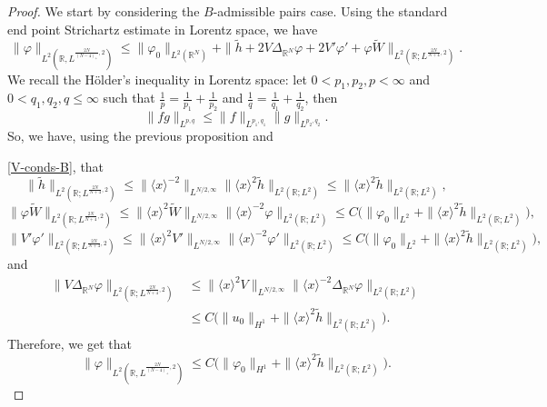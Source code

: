 \documentclass[10pt,a4paper]{amsart}
\newcommand{\R}{\mathbb{R}}
\begin{document}
\begin{proof}
We start by considering the $B$-admissible pairs case.
Using the standard end point Strichartz estimate in Lorentz space, we have
\begin{equation}
\label{stripausa}
\|\varphi\|_{L^2 (\R, L^{\frac{2N}{(N-4)_+},2 })} \leq \|\varphi_0\|_{L^2 (\R^N)} + \| \tilde{h} + 2V\Delta_{\R^N} \varphi +2V' \varphi' +\varphi\tilde{W}\|_{L^2 (\R; L^{\frac{2N}{N+4} ,2})}. 
\end{equation}
We recall the H\"older's inequality in Lorentz space: let $0<p_1,p_2,p<\infty$ and  $0<q_1,q_2, q \leq \infty$ such that  $\frac{1}{p}= \frac{1}{p_1}+\frac{1}{p_2}$ and  $\frac{1}{q}=\frac{1}{q_1}+\frac{1}{q_2}$, then
$$\|fg\|_{L^{p,q}} \leq \|f\|_{L^{p_1,q_1}}\|g\|_{L^{p_2 , q_2}}.$$
So, we have, using the previous proposition and 

\eqref{V-conds-B},  
that
$$ \| \tilde{h} \|_{L^2 (\R ; L^{\frac{2N}{N+4} ,2})} \leq \|\langle x\rangle ^{-2}\|_{L^{N/2,\infty}} \|\langle x\rangle^2  \tilde{h}\|_{L^2 (\R ; L^2)}\leq  \|\langle x\rangle^2  \tilde{h}\|_{L^2 (\R ; L^2)},$$
$$ \| \varphi\tilde{W} \|_{L^2 (\R ; L^{\frac{2N}{N+4} ,2})} \leq \|\langle x\rangle^2 \tilde{W}\|_{L^{N/2,\infty}} \|\langle x\rangle ^{-2} \varphi\|_{L^2 (\R ; L^2)}\leq C \big(\|\varphi_0\|_{L^2 } + \|\langle x\rangle^2  \tilde{h}\|_{L^2 (\R ; L^2)}\big), $$
$$ \| V' \varphi' \|_{L^2 (\R ; L^{\frac{2N}{N+4} ,2})} \leq \|\langle x\rangle^2 V' \|_{L^{N/2,\infty}} \|\langle x\rangle ^{-2} \varphi' \|_{L^2 (\R ; L^2)}\leq C \big(\|\varphi_0\|_{L^2} + \|\langle x\rangle^2  \tilde{h}\|_{L^2 (\R ; L^2)}\big) ,$$
and
\begin{align*}
 \| V\Delta_{\R^N} \varphi \|_{L^2 (\R ; L^{\frac{2N}{N+4} ,2})}& \leq \|\langle x\rangle^2 V \|_{L^{N/2,\infty}} \|\langle x\rangle ^{-2} \Delta_{\R^N} \varphi \|_{L^2 (\R ; L^2)} \\
&\leq C  \big(\|u_0\|_{H^1} + \|\langle x\rangle^2  \tilde{h}\|_{L^2 (\R ; L^2)}\big) .
\end{align*}
Therefore, we get that
\begin{equation}
\label{endpointstr}
\|\varphi\|_{L^2 (\R , L^{\frac{2N}{(N-4)_+},2 })} \leq  C  \big(\|\varphi_0\|_{H^1} + \|\langle x\rangle^2  \tilde{h}\|_{L^2 (\R ; L^2)}\big) .

\end{equation}
\end{proof}
\end{document}
